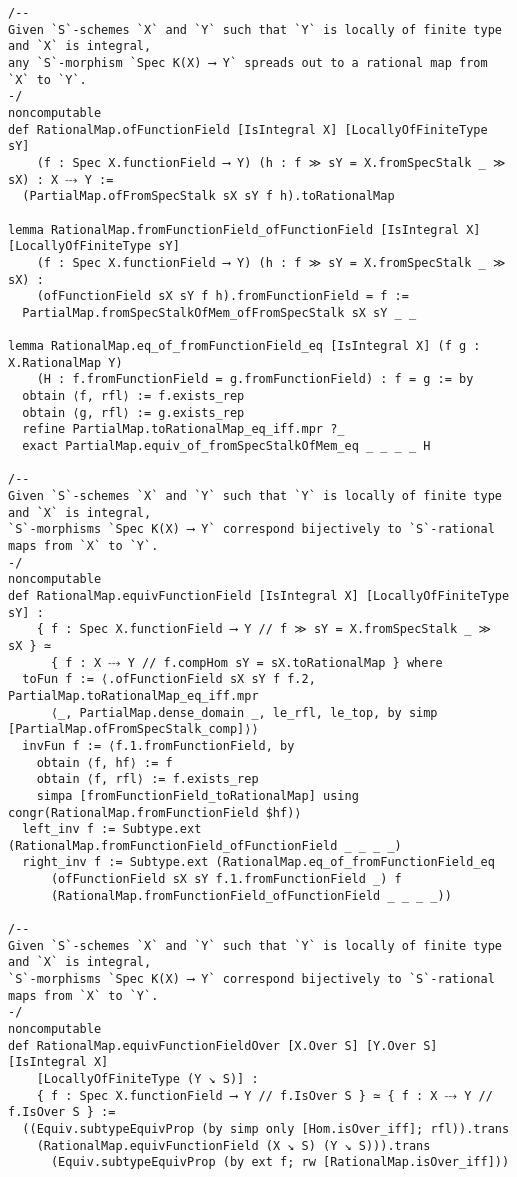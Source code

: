 \documentclass{article}
\begin{document}
\begin{lstlisting}[language=Lean, caption={RationalMap.lean}]
/--
Given `S`-schemes `X` and `Y` such that `Y` is locally of finite type and `X` is integral,
any `S`-morphism `Spec K(X) ⟶ Y` spreads out to a rational map from `X` to `Y`.
-/
noncomputable
def RationalMap.ofFunctionField [IsIntegral X] [LocallyOfFiniteType sY]
    (f : Spec X.functionField ⟶ Y) (h : f ≫ sY = X.fromSpecStalk _ ≫ sX) : X ⤏ Y :=
  (PartialMap.ofFromSpecStalk sX sY f h).toRationalMap

lemma RationalMap.fromFunctionField_ofFunctionField [IsIntegral X] [LocallyOfFiniteType sY]
    (f : Spec X.functionField ⟶ Y) (h : f ≫ sY = X.fromSpecStalk _ ≫ sX) :
    (ofFunctionField sX sY f h).fromFunctionField = f :=
  PartialMap.fromSpecStalkOfMem_ofFromSpecStalk sX sY _ _

lemma RationalMap.eq_of_fromFunctionField_eq [IsIntegral X] (f g : X.RationalMap Y)
    (H : f.fromFunctionField = g.fromFunctionField) : f = g := by
  obtain ⟨f, rfl⟩ := f.exists_rep
  obtain ⟨g, rfl⟩ := g.exists_rep
  refine PartialMap.toRationalMap_eq_iff.mpr ?_
  exact PartialMap.equiv_of_fromSpecStalkOfMem_eq _ _ _ _ H

/--
Given `S`-schemes `X` and `Y` such that `Y` is locally of finite type and `X` is integral,
`S`-morphisms `Spec K(X) ⟶ Y` correspond bijectively to `S`-rational maps from `X` to `Y`.
-/
noncomputable
def RationalMap.equivFunctionField [IsIntegral X] [LocallyOfFiniteType sY] :
    { f : Spec X.functionField ⟶ Y // f ≫ sY = X.fromSpecStalk _ ≫ sX } ≃
      { f : X ⤏ Y // f.compHom sY = sX.toRationalMap } where
  toFun f := ⟨.ofFunctionField sX sY f f.2, PartialMap.toRationalMap_eq_iff.mpr
      ⟨_, PartialMap.dense_domain _, le_rfl, le_top, by simp [PartialMap.ofFromSpecStalk_comp]⟩⟩
  invFun f := ⟨f.1.fromFunctionField, by
    obtain ⟨f, hf⟩ := f
    obtain ⟨f, rfl⟩ := f.exists_rep
    simpa [fromFunctionField_toRationalMap] using congr(RationalMap.fromFunctionField $hf)⟩
  left_inv f := Subtype.ext (RationalMap.fromFunctionField_ofFunctionField _ _ _ _)
  right_inv f := Subtype.ext (RationalMap.eq_of_fromFunctionField_eq
      (ofFunctionField sX sY f.1.fromFunctionField _) f
      (RationalMap.fromFunctionField_ofFunctionField _ _ _ _))

/--
Given `S`-schemes `X` and `Y` such that `Y` is locally of finite type and `X` is integral,
`S`-morphisms `Spec K(X) ⟶ Y` correspond bijectively to `S`-rational maps from `X` to `Y`.
-/
noncomputable
def RationalMap.equivFunctionFieldOver [X.Over S] [Y.Over S] [IsIntegral X]
    [LocallyOfFiniteType (Y ↘ S)] :
    { f : Spec X.functionField ⟶ Y // f.IsOver S } ≃ { f : X ⤏ Y // f.IsOver S } :=
  ((Equiv.subtypeEquivProp (by simp only [Hom.isOver_iff]; rfl)).trans
    (RationalMap.equivFunctionField (X ↘ S) (Y ↘ S))).trans
      (Equiv.subtypeEquivProp (by ext f; rw [RationalMap.isOver_iff]))


\end{lstlisting}
\end{document}
